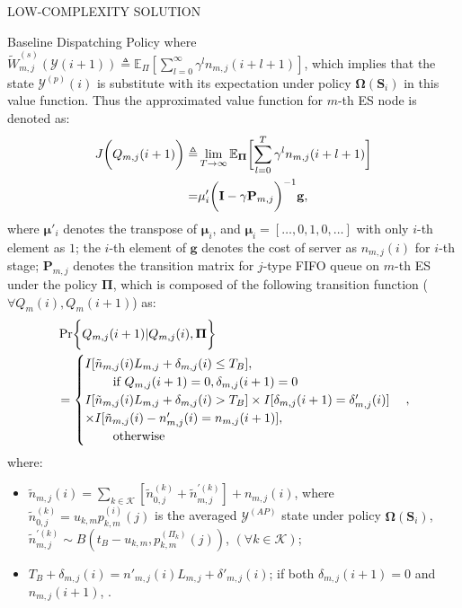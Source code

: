\documentclass[10pt, conference, letterpaper]{IEEEtran}
\newcommand{\mat}{\mathbf}
\newcommand{\define}{\triangleq}
\renewcommand{\vec}{\mathbf}
\DeclarePairedDelimiter{\Paren}{\bigg(}{\bigg)}
\DeclarePairedDelimiter{\Bracket}{\bigg[}{\bigg]}
\DeclarePairedDelimiter{\Brace}{\bigg\{}{\bigg\}}
\newcommand{\apSet}{\mathcal{K}}
\newcommand{\Stat}{\mathbf{S}}
\newcommand{\Obsv}{\mathcal{Y}}
\newcommand{\Policy}{\mathbf{\Omega}}
\begin{document}
\begin{section}{LOW-COMPLEXITY SOLUTION}
\begin{subsection}{Baseline Dispatching Policy}
            where $\tilde{W}^{(s)}_{m,j}(\Obsv(i+1)) \define \mathbb{E}_{\Pi}[\sum_{l=0}^{\infty} \gamma^{l} n_{m,j}(i+l+1)]$, which implies that the state $\Obsv^{(p)}(i)$ is substitute with its expectation under policy $\Policy(\Stat_i)$ in this value function.
            Thus the approximated value function for $m$-th ES node is denoted as:
            \begin{align}
                J\Paren{Q_{m,j}(i+1)} \define& \lim_{T\to\infty}
                    \mathbb{E}_{\vec{\Pi}} \Bracket{\sum_{l=0}^{T} \gamma^{l} n_{m,j}(i+l+1)}
                \nonumber\\
                =& \vec{\mu}'_i \Paren{ \mat{I}-\gamma\mat{P}_{m,j} }^{-1} \vec{g},
            \end{align}
            where $\vec{\mu}'_i$ denotes the transpose of $\vec{\mu}_i$, and $\vec{\mu}_i = [\dots,0,1,0,\dots]$ with only $i$-th element as $1$; the $i$-th element of $\vec{g}$ denotes the cost of server as $n_{m,j}(i)$ for $i$-th stage; $\mat{P}_{m,j}$ denotes the transition matrix for $j$-type FIFO queue on $m$-th ES under the policy $\vec{\Pi}$, which is composed of the following transition function ($\forall Q_m(i),Q_m(i+1)$) as:
            \begin{align}
                &\Pr \Brace{Q_{m,j}(i+1)|Q_{m,j}(i),\vec{\Pi}}
                \nonumber\\
                &=\begin{cases}
                    I[\tilde{n}_{m,j}(i)L_{m,j}+\delta_{m,j}(i) \leq T_B], &\\
                        \;\;\;\;\;\;\;\;\text{if } Q_{m,j}(i+1)=0,\delta_{m,j}(i+1)=0 \\
                    I[\tilde{n}_{m,j}(i)L_{m,j}+\delta_{m,j}(i) > T_B] \times I[\delta_{m,j}(i+1)=\delta'_{m,j}(i)] 
                    \nonumber\\
                    \times I[\tilde{n}_{m,j}(i) - n'_{m,j}(i) = n_{m,j}(i+1)], &\\
                        \;\;\;\;\;\;\;\;\text{otherwise}
                \end{cases},
            \end{align}
            where:
            \begin{itemize}
                \item $\tilde{n}_{m,j}(i) = \sum_{k\in\apSet} [\tilde{n}^{(k)}_{0,j} + \tilde{n}^{'(k)}_{m,j}] + n_{m,j}(i)$, where $\tilde{n}^{(k)}_{0,j} = u_{k,m}p^{(i)}_{k,m}(j)$ is the averaged $\Obsv^{(AP)}$ state under policy $\Policy(\Stat_i)$, $\tilde{n}^{'(k)}_{m,j} \sim B(t_B-u_{k,m}, p^{(\Pi_k)}_{k,m}(j))$, $(\forall k\in\apSet)$;
                \item $T_B+\delta_{m,j}(i)= n'_{m,j}(i) L_{m,j} + \delta'_{m,j}(i)$; if both $\delta_{m,j}(i+1)=0$ and $n_{m,j}(i+1)$, .
            \end{itemize}
        \end{subsection}


\end{section}
\end{document}
